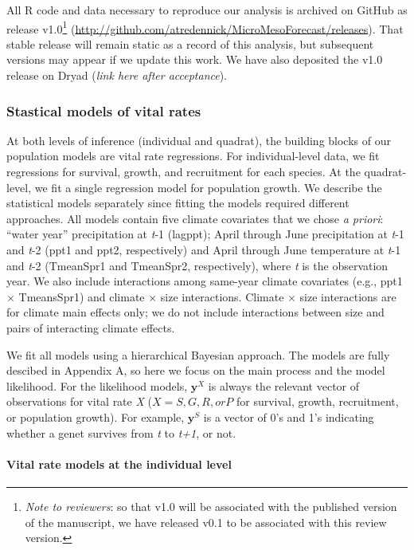 \documentclass[12pt,]{article}
\let\rmarkdownfootnote\footnote%
\def\footnote{\protect\rmarkdownfootnote}
\begin{document}
All R code and data necessary to reproduce our analysis is archived on
GitHub as release v1.0\footnote{\emph{Note to reviewers}: so that v1.0
  will be associated with the published version of the manuscript, we
  have released v0.1 to be associated with this review version.}
(\url{http://github.com/atredennick/MicroMesoForecast/releases}). That
stable release will remain static as a record of this analysis, but
subsequent versions may appear if we update this work. We have also
deposited the v1.0 release on Dryad (\emph{link here after acceptance}).

\subsubsection{Stastical models of vital
rates}\label{stastical-models-of-vital-rates}

At both levels of inference (individual and quadrat), the building
blocks of our population models are vital rate regressions. For
individual-level data, we fit regressions for survival, growth, and
recruitment for each species. At the quadrat-level, we fit a single
regression model for population growth. We describe the statistical
models separately since fitting the models required different
approaches. All models contain five climate covariates that we chose
\emph{a priori}: ``water year'' precipitation at \emph{t}-1 (lagppt);
April through June precipitation at \emph{t}-1 and \emph{t}-2 (ppt1 and
ppt2, respectively) and April through June temperature at \emph{t}-1 and
\emph{t}-2 (TmeanSpr1 and TmeanSpr2, respectively), where \emph{t} is
the observation year. We also include interactions among same-year
climate covariates (e.g., ppt1 \(\times\) TmeansSpr1) and climate
\(\times\) size interactions. Climate \(\times\) size interactions are
for climate main effects only; we do not include interactions between
size and pairs of interacting climate effects.

We fit all models using a hierarchical Bayesian approach. The models are
fully descibed in Appendix A, so here we focus on the main process and
the model likelihood. For the likelihood models, \(\textbf{y}^X\) is
always the relevant vector of observations for vital rate \emph{X}
(\(X = S, G, R, or P\) for survival, growth, recruitment, or population
growth). For example, \(\textbf{y}^S\) is a vector of 0's and 1's
indicating whether a genet survives from \emph{t} to \emph{t+1}, or not.

\paragraph{Vital rate models at the individual
level}\label{vital-rate-models-at-the-individual-level}
\end{document}
